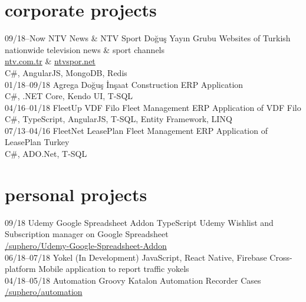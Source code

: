 \documentclass[]{../friggeri-cv} %
\begin{document}
\section{corporate projects}

\begin{entrylist}

\entry
{09/18--Now}
{NTV News \& NTV Sport}
{Doğuş Yayın Grubu}
{Websites of Turkish nationwide television news \& sport channels
\\\href{https://www.ntv.com.tr/}{ntv.com.tr} \& \href{http://www.ntvspor.net/}{ntvspor.net}
\\C\#, AngularJS, MongoDB, Redis}
\\
\entry
{01/18--09/18}
{Agrega}
{Doğuş İnşaat}
{Construction ERP Application
\\C\#, .NET Core, Kendo UI, T-SQL}
\\
\entry
{04/16--01/18}
{FleetUp}
{VDF Filo}
{Fleet Management ERP Application of VDF Filo
\\C\#, TypeScript, AngularJS, T-SQL, Entity Framework, LINQ}
\\
\entry
{07/13--04/16}
{FleetNet}
{LeasePlan}
{Fleet Management ERP Application of LeasePlan Turkey
\\C\#, ADO.Net, T-SQL}

\end{entrylist}

\section{personal projects}

\begin{entrylist}

\entry
{09/18}
{Udemy Google Spreadsheet Addon}
{TypeScript}
{Udemy Wishlist and Subscription manager on Google Spreadsheet
\\\href{https://github.com/suphero/Udemy-Google-Spreadsheet-Addon}{\faGithub/suphero/Udemy-Google-Spreadsheet-Addon}}
\\
\entry
{06/18--07/18}
{Yokel (In Development)}
{JavaScript, React Native, Firebase}
{Cross-platform Mobile application to report traffic yokels}
\\
\entry
{04/18--05/18}
{Automation}
{Groovy}
{Katalon Automation Recorder Cases
\\\href{https://github.com/suphero/automation}{\faGithub/suphero/automation}}
\end{entrylist}
\end{document}
